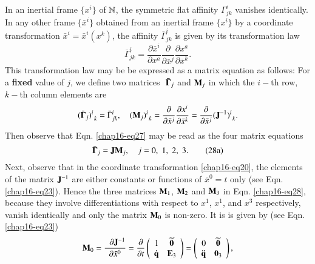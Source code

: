 In an inertial frame $\{x^i\}$ of $\mathbb{N}$, the symmetric flat affinity $\Gamma^i_{jk}$ vanishes identically. In any other frame $\{\bar{x}^i\}$ obtained from an inertial frame $\{x^i\}$ by a coordinate transformation $\bar{x}^i=\bar{x}^i(x^k)$,  the affinity $\bar{\Gamma}^i_{jk}$ is given by its  transformation law
\begin{equation}
\bar{\Gamma}^i_{jk}=\frac{\partial \bar{x}^i}{\partial x^a} \frac{\partial}{\partial \bar{x}^j}\frac{\partial x^a} {\partial \bar{x}^k}.\label{chap16-eq27}
\end{equation}
This transformation law may be  be expressed as a matrix equation as follows: For a \textbf{fixed} value of  $j$, we define two matrices  $\bar{\,\,\bm{\Gamma}_j} $ and ${\mathbf{M}}_j$ in which the $i-$th row, $k-$th column elements are
\begin{equation}
(\bar{\bm{\Gamma}}_j)^i_{\;\,k}=\bar{\Gamma}^i_{jk} , \quad ({\mathbf{M}}_j )^i_{\;\,k}= \frac{\partial}{\partial \bar{x}^j}\frac{\partial x^i} {\partial \bar{x}^k} =\frac{\partial}{\partial \bar{x}^j} ({\mathbf{J}^{-1}})^i_{\;\,k}.\label{chap16-eq28}
\end{equation}
Then observe that Eqn. \eqref{chap16-eq27} may be read as the four matrix equations  
\begin{equation*}
\bar{\bm{\Gamma}}_j= {\mathbf{J}}{\mathbf{M}}_j,\quad j=0,\;1,\;2,\;3.\tag{28a}\label{chap16-eq28a}
\end{equation*}
Next, observe that in the coordinate transformation \eqref{chap16-eq20}, the elements of the matrix  $\mathbf{J}^{-1}$ are either constants or  functions of  $\bar{x}^0=t$ only (see Eqn. \eqref{chap16-eq23}). Hence the three matrices  ${\mathbf{M}}_1$, ${\mathbf{M}}_2$ and  ${\mathbf{M}}_3$ in Eqn. \eqref{chap16-eq28}, because they involve differentiations with respect to $x^1$, $x^1$, and $x^3$ respectively, vanish identically and only the matrix  ${\mathbf{M}}_0$ is non-zero. It is is given by (see Eqn. \eqref{chap16-eq23})
\begin{equation}
{\mathbf{M}}_0=\frac{\;\;\partial{\mathbf{J}}^{-1}} {\partial\bar{x} ^0} =\frac{\partial}{\partial t}\left(\begin{array}{rc} 1 &\widetilde{\mathbf{0}}  \\ \mathbf{\dot{q}} 
 & \mathbf{E}_3 \end{array}\right)=\left(\begin{array}{rc} 0 & \widetilde{\mathbf{0}} \\ \mathbf{\ddot{q}}  & \mathbf{0}_3 \end{array}\right),\label{chap16-eq29}
\end{equation}
